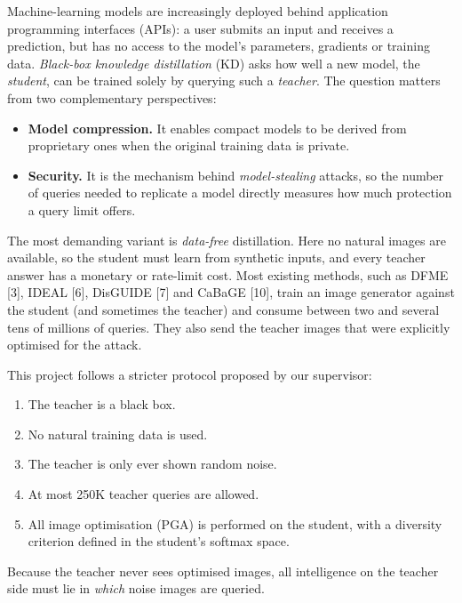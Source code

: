 \documentclass[
  10pt,
]{article}
\providecommand{\tightlist}{%
  \setlength{\itemsep}{0pt}\setlength{\parskip}{0pt}}
\begin{document}
Machine-learning models are increasingly deployed behind application
programming interfaces (APIs): a user submits an input and receives a
prediction, but has no access to the model's parameters, gradients or
training data. \emph{Black-box knowledge distillation} (KD) asks how
well a new model, the \emph{student}, can be trained solely by querying
such a \emph{teacher}. The question matters from two complementary
perspectives:

\begin{itemize}
\tightlist
\item
  \textbf{Model compression.} It enables compact models to be derived
  from proprietary ones when the original training data is private.
\item
  \textbf{Security.} It is the mechanism behind \emph{model-stealing}
  attacks, so the number of queries needed to replicate a model directly
  measures how much protection a query limit offers.
\end{itemize}

The most demanding variant is \emph{data-free} distillation. Here no
natural images are available, so the student must learn from synthetic
inputs, and every teacher answer has a monetary or rate-limit cost. Most
existing methods, such as DFME {[}3{]}, IDEAL {[}6{]}, DisGUIDE {[}7{]}
and CaBaGE {[}10{]}, train an image generator against the student (and
sometimes the teacher) and consume between two and several tens of
millions of queries. They also send the teacher images that were
explicitly optimised for the attack.

This project follows a stricter protocol proposed by our supervisor:

\begin{enumerate}
\def\labelenumi{\arabic{enumi}.}
\tightlist
\item
  The teacher is a black box.
\item
  No natural training data is used.
\item
  The teacher is only ever shown random noise.
\item
  At most 250K teacher queries are allowed.
\item
  All image optimisation (PGA) is performed on the student, with a
  diversity criterion defined in the student's softmax space.
\end{enumerate}

Because the teacher never sees optimised images, all intelligence on the
teacher side must lie in \emph{which} noise images are queried.
\end{document}
